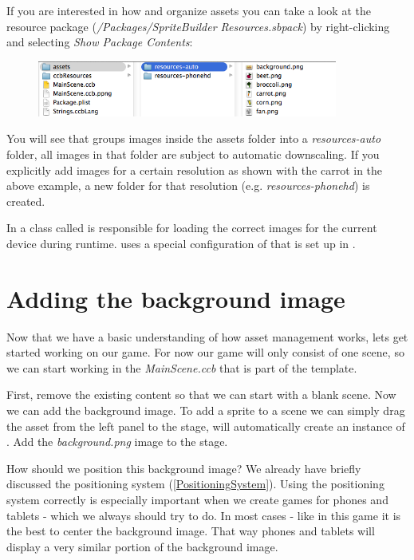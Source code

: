 \begin{details}[frametitle={Behind the scenes}] 
If you are interested in how \SB{} and \cocos{} organize assets you can take a
look at the resource package
(\textit{/Packages/\allowbreak{}SpriteBuilder Resources\allowbreak{}.sbpack}) by
right-clicking and selecting \textit{Show Package Contents}:
\begin{figure}[H]
		\centering
		\includegraphics[width=280pt]{images/Chapter2/behindscenes_resourcepack.png}
\end{figure}
You will see that \SB{} groups images inside the assets folder into a
\textit{resources-auto} folder, all images in that folder are subject to
automatic downscaling. If you explicitly add images for a certain resolution as
shown with the carrot in the above example, a new folder for that resolution
(e.g. \textit{resources-phonehd}) is created.

In \cocos{} a class called  is responsible for loading
the correct images for the current device during runtime. \SB{} uses a special
configuration of  that is set up in
. 
\end{details}

\section{Adding the background image}
Now that we have a basic understanding of how asset management works, lets get
started working on our game. For now our game will only consist of one scene, so
we can start working in the \textit{MainScene.ccb} that is part of the \SB{}
template. 

\begin{leftbar}
First, remove the existing content so that we can start with a blank
scene. Now we can add the background image. To add a sprite to a scene we can
simply drag the asset from the left panel to the stage, \SB{} will
automatically create an instance of \ccsprite{}. Add the \textit{background.png} image to the stage.
\end{leftbar}

How should we position this background image? We already have briefly discussed
the \SB{} positioning system (\ref{PositioningSystem}). Using the positioning
system correctly is especially important when we create games for phones and tablets -
which we always should try to do. In most cases - like in this game it is the
best to center the background image. That way phones and tablets will display a
very similar portion of the background image. 

